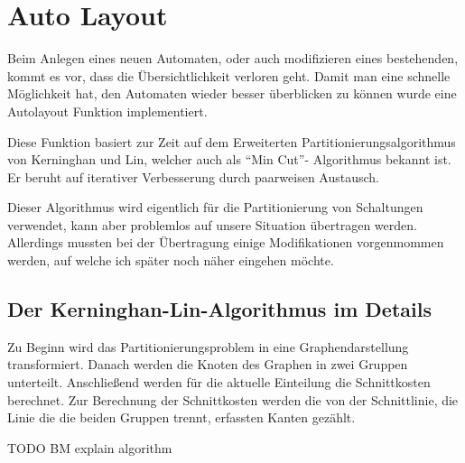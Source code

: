 

\chapter{Auto Layout}\label{AutoLayout}

Beim Anlegen eines neuen Automaten, oder auch modifizieren eines bestehenden,
kommt es vor, dass die Übersichtlichkeit verloren geht. Damit man eine schnelle
Möglichkeit hat, den Automaten wieder besser überblicken zu können wurde eine
Autolayout Funktion implementiert.\vspace{10pt}

Diese Funktion basiert zur Zeit auf dem Erweiterten Partitionierungsalgorithmus
von Kerninghan und Lin, welcher auch als "`Min Cut"'- Algorithmus bekannt
ist. Er beruht auf iterativer Verbesserung durch paarweisen
Austausch.\vspace{10pt}

Dieser Algorithmus wird eigentlich für die Partitionierung von Schaltungen
verwendet, kann aber problemlos auf unsere Situation übertragen werden.
Allerdings mussten bei der Übertragung einige Modifikationen
vorgenmommen werden, auf welche ich später noch näher eingehen
möchte.\vspace{10pt}

\section{Der Kerninghan-Lin-Algorithmus im Details}

Zu Beginn wird das Partitionierungsproblem in eine Graphendarstellung
transformiert. Danach werden die Knoten des Graphen in zwei Gruppen unterteilt.
Anschließend werden für die aktuelle Einteilung die Schnittkosten berechnet.
Zur Berechnung der Schnittkosten werden die von der Schnittlinie, die Linie die
die beiden Gruppen trennt, erfassten Kanten gezählt.\vspace{10pt}

TODO BM explain algorithm


